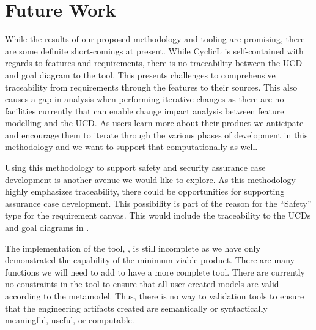 \chapter{Future Work}

While the results of our proposed methodology and tooling are promising, there are some definite short-comings at present. While CyclicL is self-contained with regards to features and requirements, there is no traceability between the \ac{UCD} and goal diagram to the tool. This presents challenges to comprehensive traceability from requirements through the features to their sources. This also causes a gap in analysis when performing iterative changes as there are no facilities currently that can enable change impact analysis between feature modelling and the \ac{UCD}. As users learn more about their product we anticipate and encourage them to iterate through the various phases of development in this methodology and we want to support that computationally as well.

Using this methodology to support safety and security assurance case development is another avenue we would like to explore. As this methodology highly emphasizes traceability, there could be opportunities for supporting assurance case development. This possibility is part of the reason for the ``Safety'' type for the requirement canvas. This would include the traceability to the \ac{UCD}s and goal diagrams in \tool.


The implementation of the tool, \tool, is still incomplete as we have only demonstrated the capability of the minimum viable product. There are many functions we will need to add to have a more complete tool. There are currently no constraints in the tool to ensure that all user created models are valid according to the metamodel. Thus, there is no way to validation tools to ensure that the engineering artifacts created are semantically or syntactically meaningful, useful, or computable.

